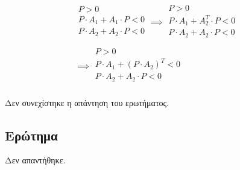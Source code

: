 \documentclass{article}
\begin{document}
\begin{equation}
    \begin{gathered}
        \begin{aligned}
            P > 0 \\
            P \cdot A_1 + A_1 \cdot P < 0 \\
            P \cdot A_2 + A_2 \cdot P < 0 \\
        \end{aligned} \implies
        \begin{aligned}
            P > 0 \\
            P \cdot A_1 + A_2^T \cdot P < 0 \\
            P \cdot A_2 + A_2 \cdot P < 0 \\
        \end{aligned}  \\ \implies
        \begin{aligned}
            P > 0 \\
            P \cdot A_1 + \left(P \cdot A_2 \right)^T < 0 \\
            P \cdot A_2 + A_2 \cdot P < 0 \\
        \end{aligned}
    \end{gathered}
\end{equation}

Δεν συνεχίστηκε η απάντηση του ερωτήματος.

\subsection{Ερώτημα}

Δεν απαντήθηκε.
\end{document}
